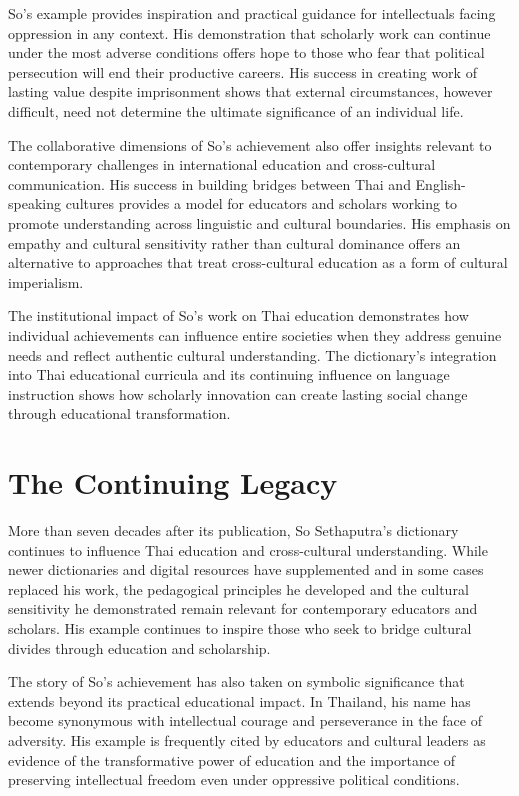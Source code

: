 \documentclass[
  Letterpaper,
]{scrbook}
\begin{document}
So's example provides inspiration and practical guidance for
intellectuals facing oppression in any context. His demonstration that
scholarly work can continue under the most adverse conditions offers
hope to those who fear that political persecution will end their
productive careers. His success in creating work of lasting value
despite imprisonment shows that external circumstances, however
difficult, need not determine the ultimate significance of an individual
life.

The collaborative dimensions of So's achievement also offer insights
relevant to contemporary challenges in international education and
cross-cultural communication. His success in building bridges between
Thai and English-speaking cultures provides a model for educators and
scholars working to promote understanding across linguistic and cultural
boundaries. His emphasis on empathy and cultural sensitivity rather than
cultural dominance offers an alternative to approaches that treat
cross-cultural education as a form of cultural imperialism.

The institutional impact of So's work on Thai education demonstrates how
individual achievements can influence entire societies when they address
genuine needs and reflect authentic cultural understanding. The
dictionary's integration into Thai educational curricula and its
continuing influence on language instruction shows how scholarly
innovation can create lasting social change through educational
transformation.

\section{The Continuing Legacy}\label{the-continuing-legacy}

More than seven decades after its publication, So Sethaputra's
dictionary continues to influence Thai education and cross-cultural
understanding. While newer dictionaries and digital resources have
supplemented and in some cases replaced his work, the pedagogical
principles he developed and the cultural sensitivity he demonstrated
remain relevant for contemporary educators and scholars. His example
continues to inspire those who seek to bridge cultural divides through
education and scholarship.

The story of So's achievement has also taken on symbolic significance
that extends beyond its practical educational impact. In Thailand, his
name has become synonymous with intellectual courage and perseverance in
the face of adversity. His example is frequently cited by educators and
cultural leaders as evidence of the transformative power of education
and the importance of preserving intellectual freedom even under
oppressive political conditions.
\end{document}
